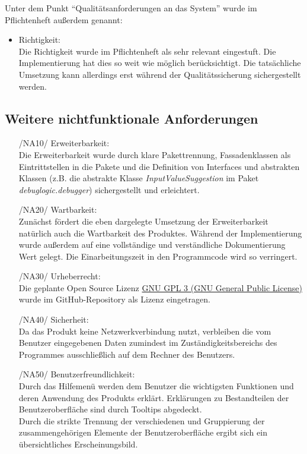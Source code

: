 \documentclass[parskip=full]{scrartcl}
\begin{document}
		Unter dem Punkt \enquote{Qualitätsanforderungen an das System} wurde im Pflichtenheft außerdem genannt:
		\begin{itemize}
		\item Richtigkeit: \\
		Die Richtigkeit wurde im Pflichtenheft als sehr relevant eingestuft. Die Implementierung hat dies so weit wie möglich berücksichtigt. Die tatsächliche Umsetzung kann allerdings erst während der Qualitätssicherung sichergestellt werden.
		\end{itemize}
		
		\subsection{Weitere nichtfunktionale Anforderungen}
		\begin{itemize}
		\item[/NA10/]Erweiterbarkeit: \\
		Die Erweiterbarkeit wurde durch klare Pakettrennung, Fassadenklassen als Eintrittstellen in die Pakete und die Definition von Interfaces und abstrakten Klassen (z.B. die abstrakte Klasse \textit{InputValueSuggestion} im Paket \textit{debuglogic.debugger}) sichergestellt und erleichtert.
		\item[/NA20/]Wartbarkeit: \\
		Zunächst fördert die eben dargelegte Umsetzung der Erweiterbarkeit natürlich auch die Wartbarkeit des Produktes. Während der Implementierung wurde außerdem auf eine vollständige und verständliche Dokumentierung Wert gelegt. Die Einarbeitungszeit in den Programmcode wird so verringert.
		\item[/NA30/]Urheberrecht: \\
		Die geplante Open Source Lizenz \href{https://www.gnu.org/licenses/gpl-3.0.de.html}{GNU GPL 3 (GNU General Public License)} wurde im GitHub-Repository als Lizenz eingetragen.
		
		\item[/NA40/] Sicherheit: \\
		Da das Produkt keine Netzwerkverbindung nutzt, verbleiben die vom Benutzer eingegebenen Daten zumindest im Zuständigkeitsbereichs des Programmes ausschließlich auf dem Rechner des Benutzers.
		\item[/NA50/]Benutzerfreundlichkeit: \\
		Durch das Hilfemenü werden dem Benutzer die wichtigsten Funktionen und deren Anwendung des Produkts erklärt. Erklärungen zu Bestandteilen der Benutzeroberfläche sind durch Tooltips abgedeckt. \\
		Durch die strikte Trennung der verschiedenen und Gruppierung der zusammengehörigen Elemente der Benutzeroberfläche ergibt sich ein übersichtliches Erscheinungsbild. 
		\end{itemize}
		
\end{document}
